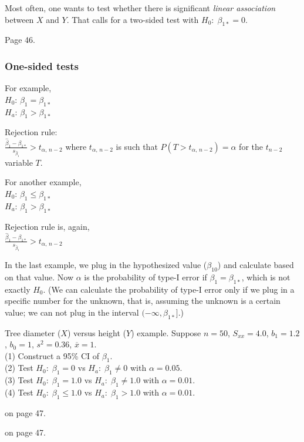 \documentclass[12pt]{article}
\begin{document}
Most often, one wants to test whether there is
significant \emph{linear association} between $X$ and $Y$.
That calls for a two-sided test with $H_0:\; \beta_{1*} = 0$.

\example
Page 46.

\subsubsection{One-sided tests}

For example,\\
$H_0$: $\beta_1 = \beta_{1*}$\\
$H_a$: $\beta_1 > \beta_{1*}$

Rejection rule:\\
$\frac{\hat{\beta}_1 - \beta_{1*}}{s_{\hat{\beta}_1}} > t_{\alpha,\, n-2}$
where
$t_{\alpha,\, n-2}$ is such that
$P(T > t_{\alpha,\, n-2}) = \alpha$
for the $t_{n-2}$ variable $T$.

For another example,\\
$H_0$: $\beta_1 \le \beta_{1*}$\\
$H_a$: $\beta_1 > \beta_{1*}$

Rejection rule is, again,\\
$\frac{\hat{\beta}_1 - \beta_{1*}}{s_{\hat{\beta}_1}} > t_{\alpha,\, n-2}$

In the last example,
we plug in the hypothesized value ($\beta_{10}$)
and calculate based on that value.
Now $\alpha$ is the probability of type-I error if
$\beta_1 = \beta_{1*}$, which is not exactly $H_0$.
(We can calculate the probability of type-I error
only if we plug in a specific number for the unknown,
that is, assuming the unknown is a certain value;
we can not plug in the interval $(-\infty, \beta_{1*}]$.)

\example \label{ex:tree}
Tree diameter ($X$) versus height ($Y$) example.
Suppose
$n = 50$, $S_{xx} = 4.0$, $b_1 = 1.2$, $b_0 = 1$,
$s^2 = 0.36$, $\overline{x} = 1$.\\
(1) Construct a 95\% CI of $\beta_1$.\\
(2) Test $H_0:\; \beta_1 = 0$ vs $H_a:\; \beta_1 \ne 0$
    with $\alpha = 0.05$.\\
(3) Test $H_0:\; \beta_1 = 1.0$ vs $H_a:\; \beta_1 \ne 1.0$
    with $\alpha = 0.01$.\\
(4) Test $H_0:\; \beta_1 \le 1.0$ vs $H_a:\; \beta_1 > 1.0$
    with $\alpha = 0.01$.


 on page 47.

 on page 47.
\end{document}
